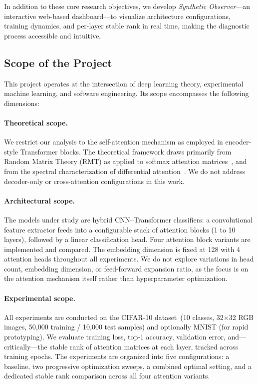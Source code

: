 \documentclass[12pt, a4paper]{article}
\begin{document}
In addition to these core research objectives, we develop
\textit{Synthetic Observer}---an interactive web-based dashboard---to
visualize architecture configurations, training dynamics, and per-layer
stable rank in real time, making the diagnostic process accessible and
intuitive.

\subsection{Scope of the Project}

This project operates at the intersection of deep learning theory,
experimental machine learning, and software engineering. Its scope
encompasses the following dimensions:

\paragraph{Theoretical scope.}
We restrict our analysis to the self-attention mechanism as employed in
encoder-style Transformer blocks. The theoretical framework draws
primarily from Random Matrix Theory (RMT) as applied to softmax attention
matrices~\cite{mind_the_gap}, and from the spectral characterization
of differential attention~\cite{diff_transformer}. We do not address
decoder-only or cross-attention configurations in this work.

\paragraph{Architectural scope.}
The models under study are hybrid CNN--Transformer classifiers: a
convolutional feature extractor feeds into a configurable stack of
attention blocks (1 to 10 layers), followed by a linear classification
head. Four attention block variants are implemented and compared.
The embedding dimension is fixed at 128 with 4 attention heads throughout
all experiments. We do not explore variations in head count, embedding
dimension, or feed-forward expansion ratio, as the focus is on the
attention mechanism itself rather than hyperparameter optimization.

\paragraph{Experimental scope.}
All experiments are conducted on the CIFAR-10 dataset~(10 classes,
32$\times$32 RGB images, 50{,}000 training / 10{,}000 test samples) and
optionally MNIST (for rapid prototyping). We evaluate training loss,
top-1 accuracy, validation error, and---critically---the stable rank of
attention matrices at each layer, tracked across training epochs. The
experiments are organized into five configurations: a baseline, two
progressive optimization sweeps, a combined optimal setting, and a
dedicated stable rank comparison across all four attention variants.
\end{document}
